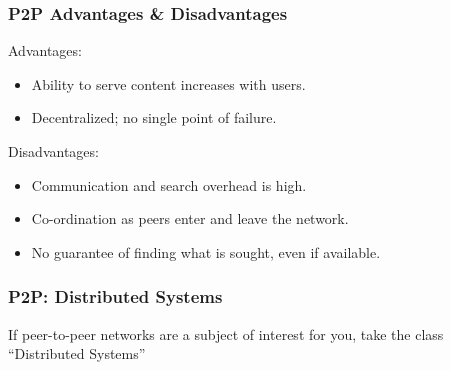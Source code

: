 \begin{frame}
\frametitle{P2P Advantages \& Disadvantages}

\begin{changemargin}{1cm}
Advantages:
\begin{itemize}
	\item Ability to serve content increases with users.
	\item Decentralized; no single point of failure.
\end{itemize}

Disadvantages:
\begin{itemize}
	\item Communication and search overhead is high.
	\item Co-ordination as peers enter and leave the network.
	\item No guarantee of finding what is sought, even if available.
\end{itemize}

\end{changemargin}
\end{frame}

\begin{frame}
\frametitle{P2P: Distributed Systems}

\begin{changemargin}{1cm}
If peer-to-peer networks are a subject of interest for you, take the class ``Distributed Systems''
\end{changemargin}
\end{frame}




